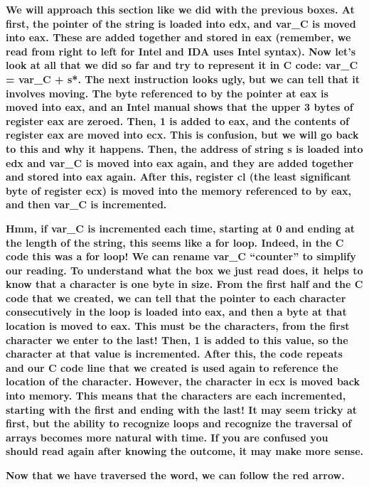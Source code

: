 \textbf{We will approach this section like we did with the previous boxes. At first, the pointer of the string is loaded
into edx, and var\_C is moved into eax. These are added together and stored in eax (remember, we read from right to
left for Intel and IDA uses Intel syntax). Now let's look at all that we did so far and try to represent it in C code:
var\_C = var\_C + s*. The next instruction looks ugly, but we can tell that it involves moving. The byte referenced to
by the pointer at eax is moved into eax, and an Intel manual shows that the upper 3 bytes of register eax are zeroed.
Then, 1 is added to eax, and the contents of register eax are moved into ecx. This is confusion, but we will go back to
this and why it happens. Then, the address of string s is loaded into edx and var\_C is moved into eax again, and they
are added together and stored into eax again. After this, register cl (the least significant byte of register ecx) is
moved into the memory referenced to by eax, and then var\_C is incremented.}

\textbf{Hmm, if var\_C is incremented each time, starting at 0 and ending at the length of the string, this seems like a
for loop. Indeed, in the C code this was a for loop! We can rename var\_C ``counter'' to simplify our reading. To
understand what the box we just read does, it helps to know that a character is one byte in size. From the first half
and the C code that we created, we can tell that the pointer to each character consecutively in the loop is loaded into
eax, and then a byte at that location is moved to eax. This must be the characters, from the first character we enter
to the last! Then, 1 is added to this value, so the character at that value is incremented. After this, the code
repeats and our C code line that we created is used again to reference the location of the character. However, the
character in ecx is moved back into memory. This means that the characters are each incremented, starting with the
first and ending with the last! It may seem tricky at first, but the ability to recognize loops and recognize the
traversal of arrays becomes more natural with time. If you are confused you should read again after knowing the
outcome, it may make more sense.}

\textbf{Now that we have traversed the word, we can follow the red arrow.}

